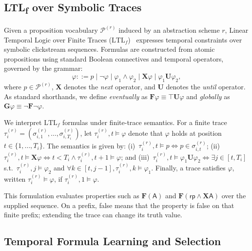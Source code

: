 \documentclass[sigconf,anonymous,nonacm]{acmart}
\newif\ifrevisions
\newcommand{\rev}[1]{\ifrevisions\textcolor{red}{#1}\else#1\fi}
\begin{document}
\subsection{\texorpdfstring{LTL\textsubscript{f}}{LTLf} over Symbolic Traces}
\label{sec:ltlf_semantics}

Given a proposition vocabulary $\mathcal{P}^{(r)}$ induced by an abstraction scheme $r$, Linear Temporal Logic over Finite Traces ($\text{LTL}_f$)~\cite{baier2006planning,de2013linear,wan2024end} expresses temporal constraints over symbolic clickstream sequences. Formulas are constructed from atomic propositions using standard Boolean connectives and temporal operators, governed by the grammar:
\begin{equation}
    \varphi ::= p \mid \neg\varphi \mid \varphi_1 \land \varphi_2 \mid \mathbf{X}\varphi \mid \varphi_1 \mathbf{U} \varphi_2,
\end{equation}
where $p \in \mathcal{P}^{(r)}$, $\mathbf{X}$ denotes the \emph{next} operator, and $\mathbf{U}$ denotes the \emph{until} operator. As standard shorthands, we define \emph{eventually} as $\mathbf{F}\varphi \equiv \top \mathbf{U} \varphi$ and \emph{globally} as $\mathbf{G}\varphi \equiv \neg\mathbf{F}\neg\varphi$.

We interpret $\text{LTL}_f$ formulas under finite-trace semantics. For a finite trace $\tau_i^{(r)} = (\sigma_{i,1}^{(r)}, \dots, \sigma_{i,T_i}^{(r)})$, let $\tau_i^{(r)}, t \models \varphi$ denote that $\varphi$ holds at position $t \in \{1, \dots, T_i\}$. The semantics is given by:
(i)~$\tau_i^{(r)}, t \models p \iff p \in \sigma_{i,t}^{(r)}$;
(ii)~$\tau_i^{(r)}, t \models \mathbf{X}\varphi \iff t < T_i \land \tau_i^{(r)}, t+1 \models \varphi$; and
(iii)~$\tau_i^{(r)}, t \models \varphi_1 \mathbf{U} \varphi_2 \iff \exists j \in [t, T_i]$ s.t.\ $\tau_i^{(r)}, j \models \varphi_2$ and $\forall k \in [t, j-1], \tau_i^{(r)}, k \models \varphi_1$.
Finally, a trace satisfies $\varphi$, written $\tau_i^{(r)} \models \varphi$, if $\tau_i^{(r)}, 1 \models \varphi$.

\rev{This formulation evaluates properties such as $\mathbf{F}(\mathsf{A})$ and $\mathbf{F}(\mathsf{rp}\land\mathbf{X}\mathsf{A})$ over the supplied sequence. On a prefix, false means that the property is false on that finite prefix; extending the trace can change its truth value.}



\subsection{Temporal Formula Learning and Selection}
\label{sec:formula_learning}
\end{document}
